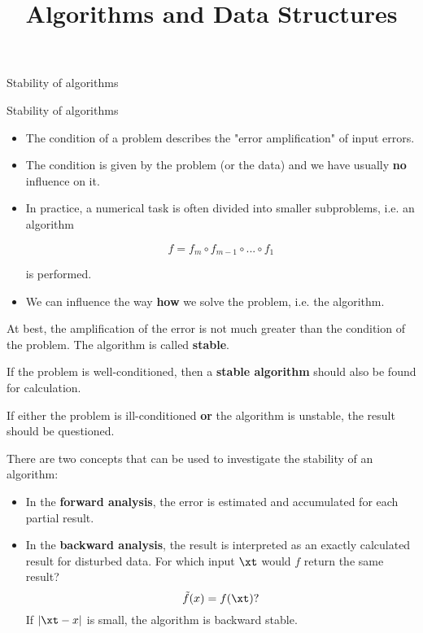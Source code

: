 \documentclass[11pt,compress,t,notes=noshow, xcolor=table]{beamer}
\title{Algorithms and Data Structures}
\begin{document}
{
  \item Stability of algorithms
}



\begin{vbframe}{Stability of algorithms}

\begin{itemize}
\item The condition of a problem describes the "error amplification" of input errors.
\item The condition is given by the problem (or the data) and we have usually \textbf{no} influence on it.
\item In practice, a numerical task is often divided into smaller subproblems, i.e. an algorithm

$$
f = f_m \circ f_{m-1} \circ ... \circ f_1
$$

is performed.
\item We can influence the way \textbf{how} we solve the problem, i.e. the algorithm.
\end{itemize}

\framebreak

At best, the amplification of the error is not much greater than the condition of the problem. The algorithm is called \textbf{stable}.

\lz

If the problem is well-conditioned, then a \textbf{stable algorithm} should also be found for calculation.

\lz

If either the problem is ill-conditioned \textbf{or} the algorithm is unstable, the result should be questioned.

\framebreak

There are two concepts that can be used to investigate the stability of an algorithm:

\begin{itemize}
\item In the \textbf{forward analysis}, the error is estimated and accumulated for each partial result.
\item In the \textbf{backward analysis}, the result is interpreted as an exactly calculated result for disturbed data. For which input $\xt$ would $f$ return the same result?
$$
\tilde f(x) = f(\xt)?
$$
If $|\xt - x|$ is small, the algorithm is backward stable.
\end{itemize}


\end{vbframe}
\end{document}
